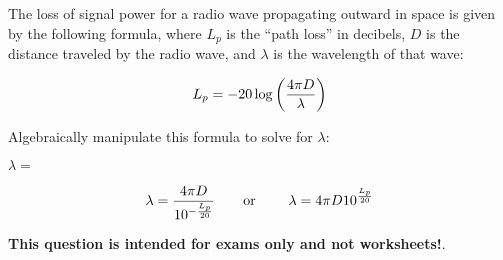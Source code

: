 

The loss of signal power for a radio wave propagating outward in space is given by the following formula, where $L_p$ is the ``path loss'' in decibels, $D$ is the distance traveled by the radio wave, and $\lambda$ is the wavelength of that wave:
 
$$L_p = -20 \log \left({4 \pi D \over \lambda}\right)$$

Algebraically manipulate this formula to solve for $\lambda$:

\vskip 20pt

$\lambda = $







$$\lambda = {4 \pi D \over 10^{-{L_p \over 20}}} \hbox{\hskip 20pt or \hskip 20pt} \lambda = {4 \pi D 10^{L_p \over 20}}$$







{\bf This question is intended for exams only and not worksheets!}.




